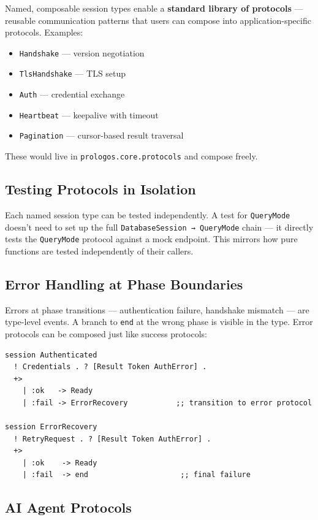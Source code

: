 \documentclass[11pt]{article}
\begin{document}
Named, composable session types enable a \textbf{standard library of protocols} ---
reusable communication patterns that users can compose into application-specific
protocols. Examples:

\begin{itemize}
\item \texttt{Handshake} --- version negotiation
\item \texttt{TlsHandshake} --- TLS setup
\item \texttt{Auth} --- credential exchange
\item \texttt{Heartbeat} --- keepalive with timeout
\item \texttt{Pagination} --- cursor-based result traversal
\end{itemize}

These would live in \texttt{prologos.core.protocols} and compose freely.
\subsection{Testing Protocols in Isolation}
\label{sec:org76da910}

Each named session type can be tested independently. A test for \texttt{QueryMode}
doesn't need to set up the full \texttt{DatabaseSession → QueryMode} chain --- it
directly tests the \texttt{QueryMode} protocol against a mock endpoint. This mirrors
how pure functions are tested independently of their callers.
\subsection{Error Handling at Phase Boundaries}
\label{sec:org1480930}

Errors at phase transitions --- authentication failure, handshake mismatch ---
are type-level events. A branch to \texttt{end} at the wrong phase is visible in the
type. Error protocols can be composed just like success protocols:

\begin{verbatim}
session Authenticated
  ! Credentials . ? [Result Token AuthError] .
  +>
    | :ok   -> Ready
    | :fail -> ErrorRecovery           ;; transition to error protocol

session ErrorRecovery
  ! RetryRequest . ? [Result Token AuthError] .
  +>
    | :ok    -> Ready
    | :fail  -> end                     ;; final failure
\end{verbatim}
\subsection{AI Agent Protocols}
\label{sec:org8d8408a}
\end{document}
